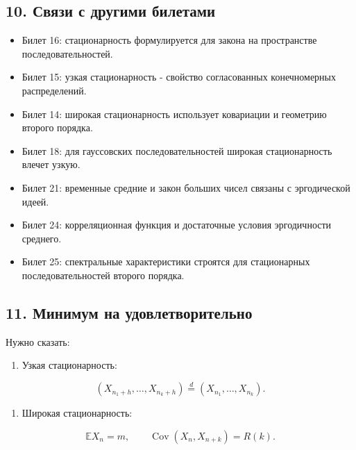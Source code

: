 \documentclass[
  11pt,
  a4paper,
]{article}
\providecommand{\tightlist}{%
  \setlength{\itemsep}{0pt}\setlength{\parskip}{0pt}}
\begin{document}
\subsection{10. Связи с другими
билетами}\label{ux441ux432ux44fux437ux438-ux441-ux434ux440ux443ux433ux438ux43cux438-ux431ux438ux43bux435ux442ux430ux43cux438}

\begin{itemize}
\tightlist
\item
  Билет 16: стационарность формулируется для закона на пространстве
  последовательностей.
\item
  Билет 15: узкая стационарность - свойство согласованных конечномерных
  распределений.
\item
  Билет 14: широкая стационарность использует ковариации и геометрию
  второго порядка.
\item
  Билет 18: для гауссовских последовательностей широкая стационарность
  влечет узкую.
\item
  Билет 21: временные средние и закон больших чисел связаны с
  эргодической идеей.
\item
  Билет 24: корреляционная функция и достаточные условия эргодичности
  среднего.
\item
  Билет 25: спектральные характеристики строятся для стационарных
  последовательностей второго порядка.
\end{itemize}

\subsection{11. Минимум на
удовлетворительно}\label{ux43cux438ux43dux438ux43cux443ux43c-ux43dux430-ux443ux434ux43eux432ux43bux435ux442ux432ux43eux440ux438ux442ux435ux43bux44cux43dux43e}

Нужно сказать:

\begin{enumerate}
\def\labelenumi{\arabic{enumi}.}
\tightlist
\item
  Узкая стационарность:
\end{enumerate}

\[
(X_{n_1+h},\ldots,X_{n_k+h})
\stackrel d=
(X_{n_1},\ldots,X_{n_k}).
\]

\begin{enumerate}
\def\labelenumi{\arabic{enumi}.}
\setcounter{enumi}{1}
\tightlist
\item
  Широкая стационарность:
\end{enumerate}

\[
\mathbb E X_n=m,
\qquad
\operatorname{Cov}(X_n,X_{n+k})=R(k).
\]
\end{document}
